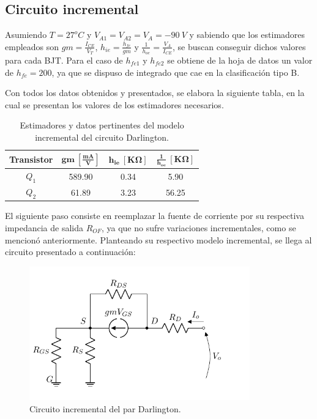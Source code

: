 \subsection{Circuito incremental}
Asumiendo $T = 27^o C$ y $V_{A1} = V_{A2} = V_A = -90 \ V$ y sabiendo que los estimadores empleados son $gm = \frac{I_{CE}}{V_T}$, $h_{ie} = \frac{h_{fe}}{gm}$ y $\frac{1}{h_{oe}} = \frac{V_A}{I_{CE}}$, se buscan conseguir dichos valores para cada BJT. Para el caso de $h_{fe1}$ y $h_{fe2}$ se obtiene de la hoja de datos un valor de $h_{fe} = 200$, ya que se dispuso de integrado que cae en la clasificación tipo B. 

Con todos los datos obtenidos y presentados, se elabora la siguiente tabla, en la cual se presentan los valores de los estimadores necesarios.
\begin{table}[H]
\centering
\begin{tabular}{cccc}
\hline
\textbf{Transistor} & $\mathbf{gm \ \left[ \frac{mA}{V} \right]}$ & $\mathbf{h_{ie} \ \left[ K\Omega \right]}$ & $\mathbf{\frac{1}{h_{oe}} \ \left[ K\Omega \right]}$ \\
\hline
$Q_1$ & 589.90 & 0.34 & 5.90 \\
$Q_2$ & 61.89 & 3.23 & 56.25	\\
\hline
\end{tabular}
\caption{Estimadores y datos pertinentes del modelo incremental del circuito Darlington.}
\label{tab:estim}
\end{table}

El siguiente paso consiste en reemplazar la fuente de corriente por su respectiva impedancia de salida $R_{OF}$, ya que no sufre variaciones incrementales, como se mencionó anteriormente. Planteando su respectivo modelo incremental, se llega al circuito presentado a continuación: 
\begin{figure}[H]
\centering
	\includegraphics[width=0.85\textwidth, page=3]{Imagenes/ModeloIncremental.pdf}
	\caption{Circuito incremental del par Darlington.}
\label{fig:incdar}
\end{figure}

